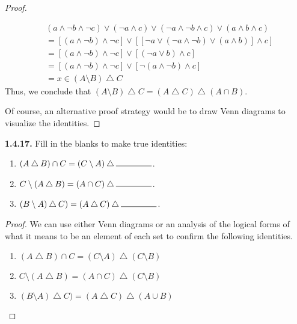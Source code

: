 \documentclass[12pt]{amsart}
\newenvironment{statement}[1]{\smallskip\noindent\color[rgb]{.6627, .3529, .6314} {\bf #1.}}{}
\theoremstyle{definition}
\theoremstyle{remark}
\begin{document}
\begin{proof}
\begin{enumerate}
	\begin{align*}
		& (a \wedge \neg b \wedge \neg c) \vee (\neg a \wedge c)
			\vee (\neg a \wedge \neg b \wedge c) \vee (a \wedge b \wedge c) \\
		&= [(a \wedge \neg b) \wedge \neg c]
			\vee [[\neg a \vee (\neg a \wedge \neg b) \vee (a \wedge b)] \wedge c] \\
		&= [(a \wedge \neg b) \wedge \neg c] \vee [(\neg a \vee b) \wedge c] \\
		&= [(a \wedge \neg b) \wedge \neg c] \vee [\neg (a \wedge \neg b) \wedge c] \\
		&= x \in (A \setminus B) \bigtriangleup C
	\end{align*}
	Thus, we conclude that $(A \setminus B) \bigtriangleup C = (A \bigtriangleup C) \bigtriangleup (A \cap B)$.
\end{enumerate}
Of course, an alternative proof strategy would be to draw Venn diagrams to visualize the identities.
\end{proof}


\begin{statement}{1.4.17}
Fill in the blanks to make true identities:
\begin{enumerate}
	\item $(A \bigtriangleup B) \cap C = (C \setminus A) \bigtriangleup \rule{1.5cm}{0.15mm}$.
	\item $C \setminus (A \bigtriangleup B) = (A \cap C) \bigtriangleup \rule{1.5cm}{0.15mm}$.
	\item $(B \setminus A) \bigtriangleup C) = (A \bigtriangleup C) \bigtriangleup \rule{1.5cm}{0.15mm}$.
\end{enumerate}
\end{statement}

\begin{proof}
We can use either Venn diagrams or an analysis of the logical forms of what it means to be an element of each set to confirm the following identities.
\begin{enumerate}
	\item $(A \bigtriangleup B) \cap C = (C \setminus A) \bigtriangleup (C \setminus B)$
	\item $C \setminus (A \bigtriangleup B) = (A \cap C) \bigtriangleup (C \setminus B)$
	\item $(B \setminus A) \bigtriangleup C) = (A \bigtriangleup C) \bigtriangleup (A \cup B)$
\end{enumerate}
\end{proof}
\end{document}
